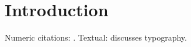 \documentclass{article}
\begin{document}
\section{Introduction}
Numeric citations: \citep{knuth1984, lamport1994}.
Textual: \citet{knuth1984} discusses typography.



\end{document}
